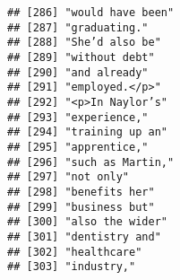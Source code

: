 \documentclass[]{article}
\begin{document}
\begin{verbatim}
## [286] "would have been"                                                                                                                          
## [287] "graduating."                                                                                                                              
## [288] "She’d also be"                                                                                                                            
## [289] "without debt"                                                                                                                             
## [290] "and already"                                                                                                                              
## [291] "employed.</p>"                                                                                                                            
## [292] "<p>In Naylor’s"                                                                                                                           
## [293] "experience,"                                                                                                                              
## [294] "training up an"                                                                                                                           
## [295] "apprentice,"                                                                                                                              
## [296] "such as Martin,"                                                                                                                          
## [297] "not only"                                                                                                                                 
## [298] "benefits her"                                                                                                                             
## [299] "business but"                                                                                                                             
## [300] "also the wider"                                                                                                                           
## [301] "dentistry and"                                                                                                                            
## [302] "healthcare"                                                                                                                               
## [303] "industry,"                                                                                                                                

\end{verbatim}
\end{document}
